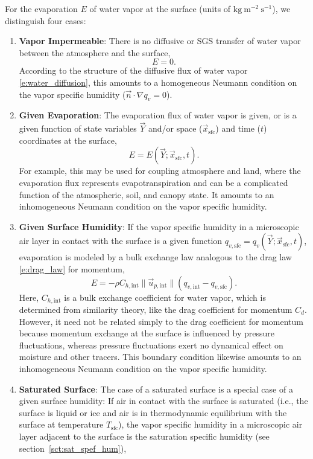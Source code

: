 \documentclass{report}
\begin{document}
For the evaporation $E$ of water vapor at the surface (units of $\mathrm{kg~m^{-2}~s^{-1}}$), we distinguish four cases:
\begin{enumerate}
    \item \textbf{Vapor Impermeable}: There is no diffusive or SGS transfer of water vapor between the atmosphere and the surface,
    \[
    E = 0.
    \]
    According to the structure of the diffusive flux of water vapor \eqref{e:water_diffusion}, this amounts to a homogeneous Neumann condition on the vapor specific humidity ($\vec{n}\cdot\nabla q_v = 0$).
    \item \textbf{Given Evaporation}: The evaporation flux of water vapor is given, or is a given function of state variables $\vec{Y}$ and/or space ($\vec{x}_\mathrm{sfc}$) and time ($t$) coordinates at the surface,
    \[
    E = E(\vec{Y}; \vec{x}_\mathrm{sfc}, t).
    \]
    For example, this may be used for coupling atmosphere and land, where the evaporation flux represents evapotranspiration and can be a complicated function of the atmospheric, soil, and canopy state. It amounts to an inhomogeneous Neumann condition on the vapor specific humidity.
    \item \textbf{Given Surface Humidity}: If the vapor specific humidity in a microscopic air layer in contact with the surface is a given function $q_{v, \mathrm{sfc}} = q_{v}(\vec{Y}; \vec{x}_\mathrm{sfc}, t)$, evaporation is modeled by a bulk exchange law analogous to the drag law \eqref{e:drag_law} for momentum,
    \begin{equation}\label{e:sfc_evaporation}
    E = - \rho C_{h, \mathrm{int}} \| \vec{u}_{p, \mathrm{int}} \| \left( q_{v, \mathrm{int}} - q_{v, \mathrm{sfc}} \right).
    \end{equation} 
    Here, $C_{h, \mathrm{int}}$ is a bulk exchange coefficient for water vapor, which is determined from similarity theory, like the drag coefficient for momentum $C_d$. However, it need not be related simply to the drag coefficient for momentum because momentum exchange at the surface is influenced by pressure fluctuations, whereas pressure fluctuations exert no dynamical effect on moisture and other tracers. This boundary condition likewise amounts to an inhomogeneous Neumann condition on the vapor specific humidity.
    \item \textbf{Saturated Surface}: The case of a saturated surface is a special case of a given surface humidity: If air in contact with the surface is saturated (i.e., the surface is liquid or ice and air is in thermodynamic equilibrium with the surface at temperature $T_\mathrm{sfc}$), the vapor specific humidity in a microscopic air layer adjacent to the surface is the saturation specific humidity (see section~\ref{sct:sat_spef_hum}),

\end{enumerate}
\end{document}
